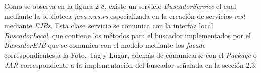 \documentclass{memoria}
\begin{document}

Como se observa en la figura 2-8,  existe un servicio \textsl{BuscadorService} el cual mediante la biblioteca \textsl{javax.ws.rs} especializada en la creación de servicios \textsl{rest} mediante \textsl{EJBs}. Esta clase servicio se comunica con la interfaz local \textsl{BuscadorLocal}, que contiene los métodos para el buscador implementados por el \textsl{BuscadorEJB} que se comunica con el modelo mediante los \textsl{facade} correspondientes a la Foto, Tag y Lugar, además de comunicarse con el \textsl{Package} o \textsl{JAR} correspondiente a la implementación del buscador señalada en la sección 2.3.

\newpage
{}

\end{document}
